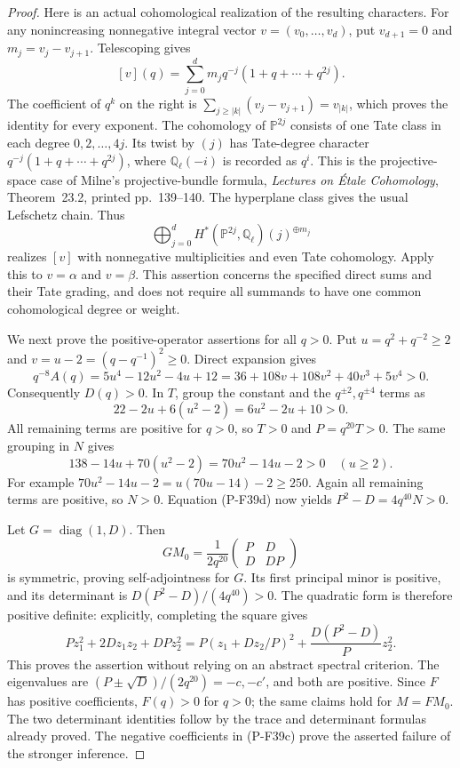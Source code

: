 \begin{proof}
Here is an actual cohomological realization of the resulting
characters. For any nonincreasing nonnegative integral vector
$v=(v_0,\ldots,v_d)$, put $v_{d+1}=0$ and
$m_j=v_j-v_{j+1}$. Telescoping gives
\[
 [v](q)=\sum_{j=0}^d m_j q^{-j}(1+q+\cdots+q^{2j}).
 \tag{P-F39h}
\]
The coefficient of $q^k$ on the right is
$\sum_{j\ge|k|}(v_j-v_{j+1})=v_{|k|}$, which proves
the identity for every exponent. The cohomology of
$\mathbb P^{2j}$ consists of one Tate class in each degree
$0,2,\ldots,4j$. Its twist by $(j)$ has Tate-degree
character $q^{-j}(1+q+\cdots+q^{2j})$, where
$\mathbb Q_\ell(-i)$ is recorded as $q^i$.
This is the projective-space case of Milne's projective-bundle
formula, \emph{Lectures on \'{E}tale Cohomology}, Theorem~23.2,
printed pp.~139--140. The hyperplane class gives the usual
Lefschetz chain. Thus
\[
       \bigoplus_{j=0}^d
       H^*(\mathbb P^{2j},\mathbb Q_\ell)(j)^{\oplus m_j}
 \tag{P-F39i}
\]
realizes $[v]$ with nonnegative multiplicities and even Tate
cohomology. Apply this to $v=\alpha$ and $v=\beta$.
This assertion concerns the specified direct sums and their
Tate grading, and does not require all summands to have one
common cohomological degree or weight.

We next prove the positive-operator assertions for all $q>0$.
Put $u=q^2+q^{-2}\ge2$ and $v=u-2=(q-q^{-1})^2\ge0$.
Direct expansion gives
\[
 q^{-8}A(q)=5u^4-12u^2-4u+12
          =36+108v+108v^2+40v^3+5v^4>0.
 \tag{P-F39n}
\]
Consequently $D(q)>0$. In $T$, group the constant and the
$q^{\pm2},q^{\pm4}$ terms as
\[
             22-2u+6(u^2-2)=6u^2-2u+10>0.
\]
All remaining terms are positive for $q>0$, so $T>0$ and
$P=q^{20}T>0$. The same grouping in $N$ gives
\[
             138-14u+70(u^2-2)=70u^2-14u-2>0
                         \quad(u\ge2).
\]
For example $70u^2-14u-2=u(70u-14)-2\ge250$.
Again all remaining terms are positive, so $N>0$.
Equation (P-F39d) now yields $P^2-D=4q^{40}N>0$.

Let $G=\operatorname{diag}(1,D)$. Then
\[
       GM_0=\frac1{2q^{20}}
          \begin{pmatrix}P&D\\D&DP\end{pmatrix}
\]
is symmetric, proving self-adjointness for $G$.
Its first principal minor is positive, and its determinant
is $D(P^2-D)/(4q^{40})>0$. The quadratic form is therefore
positive definite: explicitly, completing the square gives
\[
 P z_1^2+2D z_1z_2+DPz_2^2
   =P(z_1+D z_2/P)^2+\frac{D(P^2-D)}Pz_2^2.
\]
This proves the assertion without relying on an abstract
spectral criterion. The eigenvalues are
$(P\pm\sqrt D)/(2q^{20})=-c,-c'$, and both are positive.
Since $F$ has positive coefficients, $F(q)>0$ for $q>0$;
the same claims hold for $M=FM_0$. The two determinant
identities follow by the trace and determinant formulas
already proved. The negative coefficients in (P-F39c)
prove the asserted failure of the stronger inference.


\end{proof}
